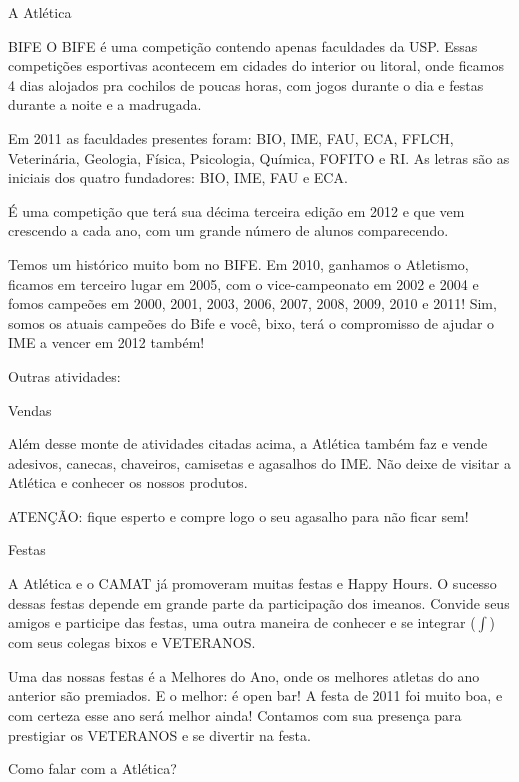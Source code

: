 \begin{secao}{A Atlética}
\begin{subsecao}{BIFE}
    O BIFE é uma competição contendo apenas faculdades da USP. Essas competições esportivas acontecem em cidades do interior ou litoral, onde ficamos 4 dias alojados pra cochilos de poucas horas, com jogos durante o dia e festas durante a noite e a madrugada.

    Em 2011 as faculdades presentes foram: BIO, IME, FAU, ECA, FFLCH, Veterinária, Geologia, Física, Psicologia, Química, FOFITO e RI. As letras são as iniciais dos quatro fundadores: BIO, IME, FAU e ECA.

    É uma competição que terá sua décima terceira edição em 2012 e que vem crescendo a cada ano, com um grande número de alunos comparecendo.

    Temos um histórico muito bom no BIFE. Em 2010, ganhamos o Atletismo, ficamos em terceiro lugar em 2005, com o vice-campeonato em 2002 e 2004 e fomos campeões em 2000, 2001, 2003, 2006, 2007, 2008, 2009, 2010 e 2011! Sim, somos os atuais campeões do Bife e você, bixo, terá o compromisso de ajudar o IME a vencer em 2012 também! 

  \end{subsecao}

  Outras atividades:

  \begin{subsecao}{Vendas}

    Além desse monte de atividades citadas acima, a Atlética também faz e vende adesivos, canecas, chaveiros, camisetas e agasalhos do IME. Não deixe de visitar a Atlética e conhecer os nossos produtos.

    ATENÇÃO: fique esperto e compre logo o seu agasalho para não ficar sem!

  \end{subsecao}
  \begin{subsecao}{Festas}

    A Atlética e o CAMAT já promoveram muitas festas e Happy Hours. O sucesso dessas festas depende em grande parte da participação dos imeanos. Convide seus amigos e participe das festas, uma outra maneira de conhecer e se integrar ($\int$) com seus colegas bixos e VETERANOS.

    Uma das nossas festas é a Melhores do Ano, onde os melhores atletas do ano anterior são premiados. E o melhor: é open bar! A festa de 2011 foi muito boa, e com certeza esse ano será melhor ainda! Contamos com sua presença para prestigiar os VETERANOS e se divertir na festa.

  \end{subsecao}
  \begin{subsecao}{Como falar com a Atlética?}


\end{subsecao}
\end{secao}
